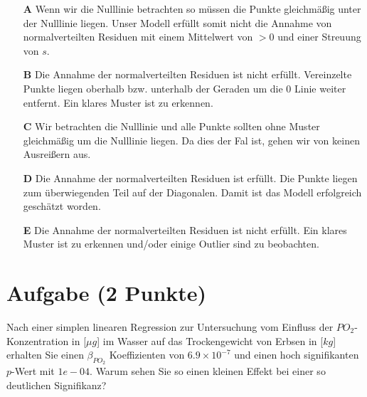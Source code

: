\documentclass[a4paper, 9pt]{scrartcl}\usepackage[]{graphicx}\usepackage[]{xcolor}
\begin{document}
\begin{enumerate}
\item [\textbf{A} \msquare] Wenn wir die Nulllinie betrachten so müssen die Punkte gleichmäßig unter der Nulllinie liegen. Unser Modell erfüllt somit nicht die Annahme von normalverteilten Residuen mit einem Mittelwert von $>0$ und einer Streuung von $s$.
\item [\textbf{B} \msquare] Die Annahme der normalverteilten Residuen ist nicht erfüllt. Vereinzelte Punkte liegen oberhalb bzw. unterhalb der Geraden um die 0 Linie weiter entfernt. Ein klares Muster ist zu erkennen.
\item [\textbf{C} \msquare] Wir betrachten die Nulllinie und alle Punkte sollten ohne Muster gleichmäßig um die Nulllinie liegen. Da dies der Fal ist, gehen wir von keinen Ausreißern aus.
\item [\textbf{D} \msquare] Die Annahme der normalverteilten Residuen ist erfüllt. Die Punkte liegen zum überwiegenden Teil auf der Diagonalen. Damit ist das Modell erfolgreich geschätzt worden.
\item [\textbf{E} \msquare] Die Annahme der normalverteilten Residuen ist nicht erfüllt. Ein klares Muster ist zu erkennen und/oder einige Outlier sind zu beobachten.
\end{enumerate}

\section{Aufgabe \hfill (2 Punkte)}

\ifcollection
\begin{flushright}
\tiny\vspace{-2Ex}
\textbf{\examinhaltstart}
\exammodulebiostat
\vspace{-1Ex}
\end{flushright}
\fi




Nach einer simplen linearen Regression zur Untersuchung vom Einfluss der $PO_2$-Konzentration in [$\mu g$] im Wasser auf das Trockengewicht von Erbsen in [$kg$] erhalten Sie einen $\beta_{PO_2}$ Koeffizienten von $6.9\times 10^{-7}$ und einen hoch signifikanten $p$-Wert mit $1e-04$. Warum sehen Sie so einen kleinen Effekt bei einer so deutlichen Signifikanz?
\end{document}
